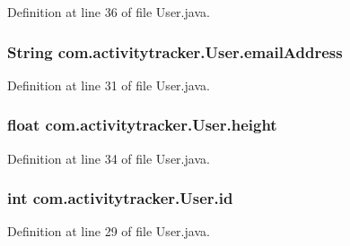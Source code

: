 Definition at line 36 of file User.\+java.

\subsubsection[{\texorpdfstring{email\+Address}{emailAddress}}]{\setlength{\rightskip}{0pt plus 5cm}String com.\+activitytracker.\+User.\+email\+Address\hspace{0.3cm}{\ttfamily [private]}}\hypertarget{classcom_1_1activitytracker_1_1_user_ac2fdb9a858d0295e52c5f8bc179e3137}{}\label{classcom_1_1activitytracker_1_1_user_ac2fdb9a858d0295e52c5f8bc179e3137}


Definition at line 31 of file User.\+java.

\subsubsection[{\texorpdfstring{height}{height}}]{\setlength{\rightskip}{0pt plus 5cm}float com.\+activitytracker.\+User.\+height\hspace{0.3cm}{\ttfamily [private]}}\hypertarget{classcom_1_1activitytracker_1_1_user_a83cdfe6f520a4e18e8710e8e11f8c3d6}{}\label{classcom_1_1activitytracker_1_1_user_a83cdfe6f520a4e18e8710e8e11f8c3d6}


Definition at line 34 of file User.\+java.

\subsubsection[{\texorpdfstring{id}{id}}]{\setlength{\rightskip}{0pt plus 5cm}int com.\+activitytracker.\+User.\+id\hspace{0.3cm}{\ttfamily [private]}}\hypertarget{classcom_1_1activitytracker_1_1_user_adc05319380c2cbb37477ab5aab86317c}{}\label{classcom_1_1activitytracker_1_1_user_adc05319380c2cbb37477ab5aab86317c}


Definition at line 29 of file User.\+java.

